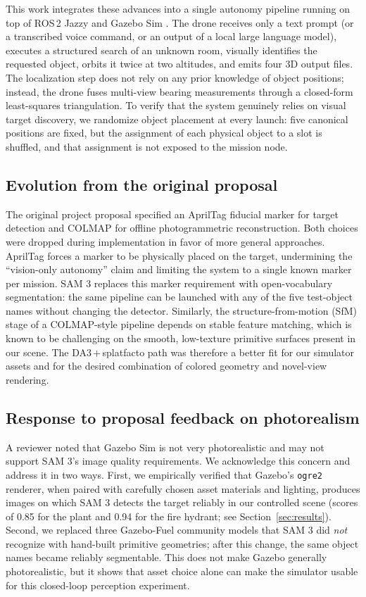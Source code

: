 \documentclass[conference]{IEEEtran}
\begin{document}
This work integrates these advances into a single autonomy pipeline
running on top of ROS\,2 Jazzy \cite{macenski2022ros2} and Gazebo Sim
\cite{koenig2004gazebo}. The drone receives only a text prompt
(or a transcribed voice command, or an output of a local large
language model), executes a structured search of an unknown room,
visually identifies the requested object, orbits it twice at two
altitudes, and emits four 3D output files. The localization step does
not rely on any prior knowledge of object positions; instead, the
drone fuses multi-view bearing measurements through a closed-form
least-squares triangulation. To verify that the system genuinely
relies on visual target discovery, we randomize object placement at
every launch: five canonical positions are fixed, but the assignment
of each physical object to a slot is shuffled, and that assignment is
not exposed to the mission node.

\subsection{Evolution from the original proposal}

The original project proposal \cite{gallai_proposal_2026} specified an
AprilTag fiducial marker for target detection and COLMAP for offline
photogrammetric reconstruction. Both choices were dropped during
implementation in favor of more general approaches. AprilTag forces a
marker to be physically placed on the target, undermining the
``vision-only autonomy'' claim and limiting the system to a single
known marker per mission. SAM 3 replaces this marker requirement with open-vocabulary
segmentation: the same pipeline can be launched with any of the five
test-object names without changing the detector. Similarly, the
structure-from-motion (SfM) stage of a COLMAP-style pipeline depends
on stable feature matching, which is known to be challenging on the
smooth, low-texture primitive surfaces present in our scene. The
DA3\,+\,splatfacto path was therefore a better fit for our simulator
assets and for the desired combination of colored geometry and
novel-view rendering.

\subsection{Response to proposal feedback on photorealism}

A reviewer noted that Gazebo Sim is not very photorealistic and may
not support SAM 3's image quality requirements. We acknowledge this
concern and address it in two ways. First, we empirically verified
that Gazebo's \texttt{ogre2} renderer, when paired with carefully
chosen asset materials and lighting, produces images on which SAM 3
detects the target reliably in our controlled scene (scores of
0.85 for the plant and 0.94 for the fire hydrant; see
Section~\ref{sec:results}). Second, we replaced three Gazebo-Fuel
community models that SAM 3 did \emph{not} recognize with hand-built
primitive geometries; after this change, the same object names became
reliably segmentable. This does not make Gazebo generally
photorealistic, but it shows that asset choice alone can make the
simulator usable for this closed-loop perception experiment.
\end{document}
